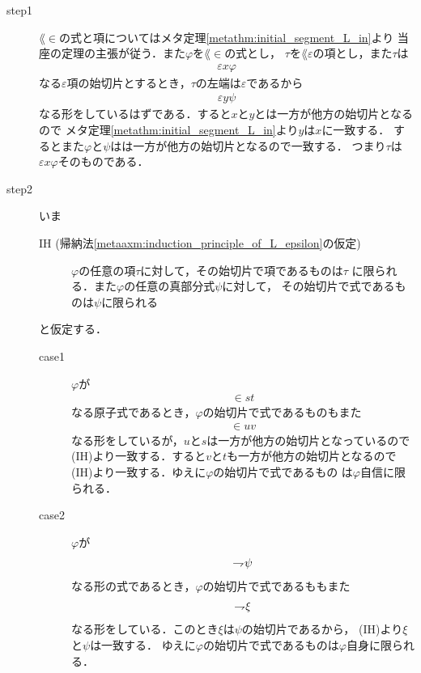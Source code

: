 	\begin{metaprf}\mbox{}
		\begin{description}
			\item[step1]
				$\lang{\in}$の式と項についてはメタ定理\ref{metathm:initial_segment_L_in}より
				当座の定理の主張が従う．また$\varphi$を$\lang{\in}$の式とし，
				$\tau$を$\lang{\varepsilon}$の項とし，また$\tau$は
				\begin{align}
					\varepsilon x \varphi
				\end{align}
				なる$\varepsilon$項の始切片とするとき，$\tau$の左端は$\varepsilon$であるから
				\begin{align}
					\varepsilon y \psi
				\end{align}
				なる形をしているはずである．すると$x$と$y$とは一方が他方の始切片となるので
				メタ定理\ref{metathm:initial_segment_L_in}より$y$は$x$に一致する．
				するとまた$\varphi$と$\psi$はは一方が他方の始切片となるので一致する．
				つまり$\tau$は$\varepsilon x \varphi$そのものである．
				
			\item[step2] いま
				\begin{description}
					\item[IH (帰納法\ref{metaaxm:induction_principle_of_L_epsilon}の仮定)]
					$\varphi$の任意の項$\tau$に対して，その始切片で項であるものは$\tau$
					に限られる．また$\varphi$の任意の真部分式$\psi$に対して，
					その始切片で式であるものは$\psi$に限られる
				\end{description}
				と仮定する．
				\begin{description}
					\item[case1]
						$\varphi$が
						\begin{align}
							\in s t
						\end{align}
						なる原子式であるとき，$\varphi$の始切片で式であるものもまた
						\begin{align}
							\in u v
						\end{align}
						なる形をしているが，$u$と$s$は一方が他方の始切片となっているので
						(IH)より一致する．すると$v$と$t$も一方が他方の始切片となるので
						(IH)より一致する．ゆえに$\varphi$の始切片で式であるもの
						は$\varphi$自信に限られる．
						
					\item[case2] $\varphi$が
						\begin{align}
							\rightharpoondown\hspace{-0.25em} \psi
						\end{align}
						なる形の式であるとき，$\varphi$の始切片で式であるももまた
						\begin{align}
							\rightharpoondown\hspace{-0.25em} \xi
						\end{align}
						なる形をしている．このとき$\xi$は$\psi$の始切片であるから，
						(IH)より$\xi$と$\psi$は一致する．
						ゆえに$\varphi$の始切片で式であるものは$\varphi$自身に限られる．
			

\end{description}
\end{description}
\end{metaprf}
